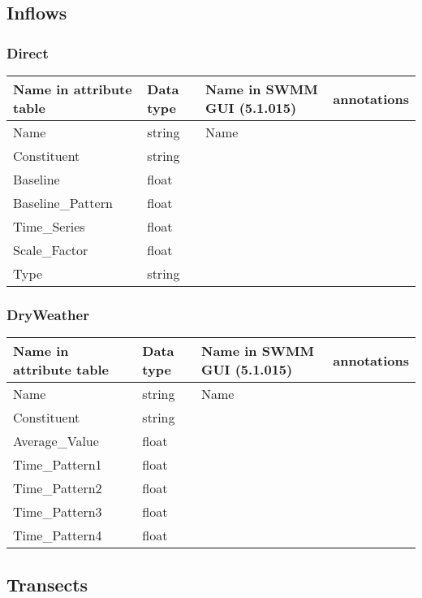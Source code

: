 \documentclass[10pt,a4paper,oneside]{scrbook}
\begin{document}
\subsection{Inflows}
\subsubsection{Direct}
\begin{tabular}{p{4cm}|p{1.3cm}|P{3cm}|P{5.7cm}}
\hline 
\textbf{Name in attribute table} & \textbf{Data type} & \textbf{Name in SWMM GUI (5.1.015)} & \textbf{annotations}\\ 
\hline 
Name & string & Name & \\
Constituent & string &  & \\ 
Baseline & float &  & \\ 
Baseline\_Pattern & float &  & \\ 
Time\_Series & float &  & \\ 
Scale\_Factor & float &  & \\ 
Type & string &  & \\ 
\hline
\end{tabular}

\subsubsection{Dry\textunderscore Weather}
\begin{tabular}{p{4cm}|p{1.3cm}|P{3cm}|P{5.7cm}}
\hline 
\textbf{Name in attribute table} & \textbf{Data type} & \textbf{Name in SWMM GUI (5.1.015)} & \textbf{annotations}\\ 
\hline 
Name & string & Name & \\
Constituent & string &  & \\ 
Average\_Value & float &  & \\ 
Time\_Pattern1 & float &  & \\  
Time\_Pattern2 & float &  & \\ 
Time\_Pattern3 & float &  & \\ 
Time\_Pattern4 & float &  & \\ 
\hline
\end{tabular}


\subsection{Transects}
\end{document}
